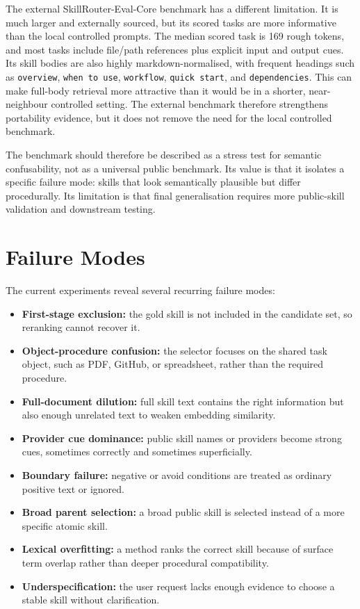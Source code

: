 The external SkillRouter-Eval-Core benchmark has a different limitation. It is much larger and externally sourced, but its scored tasks are more informative than the local controlled prompts. The median scored task is 169 rough tokens, and most tasks include file/path references plus explicit input and output cues. Its skill bodies are also highly markdown-normalised, with frequent headings such as \texttt{overview}, \texttt{when to use}, \texttt{workflow}, \texttt{quick start}, and \texttt{dependencies}. This can make full-body retrieval more attractive than it would be in a shorter, near-neighbour controlled setting. The external benchmark therefore strengthens portability evidence, but it does not remove the need for the local controlled benchmark.

The benchmark should therefore be described as a stress test for semantic confusability, not as a universal public benchmark. Its value is that it isolates a specific failure mode: skills that look semantically plausible but differ procedurally. Its limitation is that final generalisation requires more public-skill validation and downstream testing.

\section{Failure Modes}

The current experiments reveal several recurring failure modes:

\begin{itemize}
  \item \textbf{First-stage exclusion:} the gold skill is not included in the candidate set, so reranking cannot recover it.
  \item \textbf{Object-procedure confusion:} the selector focuses on the shared task object, such as PDF, GitHub, or spreadsheet, rather than the required procedure.
  \item \textbf{Full-document dilution:} full skill text contains the right information but also enough unrelated text to weaken embedding similarity.
  \item \textbf{Provider cue dominance:} public skill names or providers become strong cues, sometimes correctly and sometimes superficially.
  \item \textbf{Boundary failure:} negative or avoid conditions are treated as ordinary positive text or ignored.
  \item \textbf{Broad parent selection:} a broad public skill is selected instead of a more specific atomic skill.
  \item \textbf{Lexical overfitting:} a method ranks the correct skill because of surface term overlap rather than deeper procedural compatibility.
  \item \textbf{Underspecification:} the user request lacks enough evidence to choose a stable skill without clarification.
\end{itemize}

